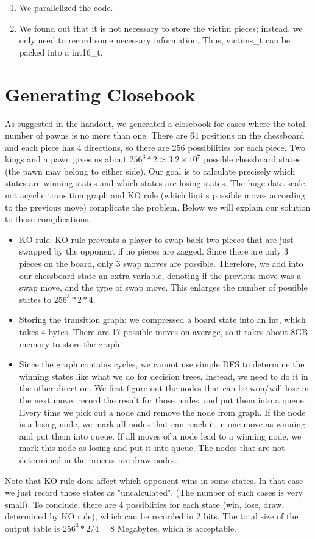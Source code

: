 \documentclass[10pt,twosidep]{article}
\begin{document}
\begin{enumerate}
  \item We parallelized the code. 
  
  \item We found  out that it is not necessary to store the victim pieces; instead, we only need to record some necessary information. Thus, victims\_t can be packed into a int16\_t. 
  
\end{enumerate}

\section{Generating Closebook}
	As suggested in the handout, we generated a closebook 
	for cases where the total number of pawns is no more than one. 
	There are 64 positions on the chessboard and each piece has 4 directions, 
	so there are 256 possibilities for each piece. 
	Two kings and a pawn gives us about $256^3*2\approx 3.2\times 10^7$ possible chessboard states 
	(the pawn may belong to either side).
	Our goal is to calculate precisely which states are winning states and which states are losing states.
	The huge data scale, not acyclic transition graph and KO rule 
	(which limits possible moves according to the previous move) complicate the problem.
	Below we will explain our solution to those complications. 

	\begin{itemize}
	\item KO rule: KO rule prevents a player to swap back two pieces that are just swapped by the opponent 
	if no pieces are zagged. Since there are only 3 pieces on the board, only 3 swap moves are possible. 
	Therefore, we add into our chessboard state an extra variable, denoting if the previous move was a swap move, 
	and the type of swap move. This enlarges the number of possible states to $256^3*2*4$.
	\item Storing the transition graph: we compressed a board state into an int, which takes 4 bytes. 
	There are 17 possible moves on average, so it takes about 8GB memory to store the graph. 
	\item Since the graph contains cycles, 
	we cannot use simple DFS to determine the winning states like what we do for decision trees. Instead, 
	we need to do it in the other direction. 
	We first figure out the nodes that can be won/will lose in the next move, 
	record the result for those nodes, and put them into a queue. 
	Every time we pick out a node and remove the node from graph. 
	If the node is a losing node, we mark all nodes that can reach it in one move as winning and put them into queue. 
	If all moves of a node lead to a winning node, we mark this node as losing and put it into queue. 
	The nodes that are not determined in the process are draw nodes. 
	\end{itemize}
	Note that KO rule does affect which opponent wins in some states. In that case 
	we just record those states as "uncalculated". (The number of such cases is very small).
	To conclude, there are 4 possiblities for each state (win, lose, draw, determined by KO rule), 
	which can be recorded in 2 bits. The total size of the output table
	is $256^3*2/4=8$ Megabytes, which is acceptable.
\end{document}
